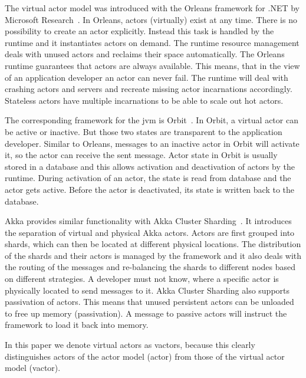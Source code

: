   The virtual actor model was introduced with the Orleans framework for .NET by Microsoft Research~\cite{bernstein:orleans}.
  In Orleans, actors (virtually) exist at any time.
  There is no possibility to create an actor explicitly.
  Instead this task is handled by the runtime and it instantiates actors on demand.
  The runtime resource management deals with unused actors and reclaims their space automatically.
  The Orleans runtime guarantees that actors are always available.
  This means, that in the view of an application developer an actor can never fail.
  The runtime will deal with crashing actors and servers and recreate missing actor incarnations accordingly.
  Stateless actors have multiple incarnations to be able to scale out hot actors.
  
  The corresponding framework for the \gls{jvm} is Orbit~\cite{orbit}.
  In Orbit, a virtual actor can be active or inactive.
  But those two states are transparent to the application developer.
  Similar to Orleans, messages to an inactive actor in Orbit will activate it, so the actor can receive the sent message.
  Actor state in Orbit is usually stored in a database and this allows activation and deactivation of actors by the runtime.
  During activation of an actor, the state is read from database and the actor gets active.
  Before the actor is deactivated, its state is written back to the database.

  Akka provides similar functionality with Akka Cluster Sharding~\cite{akka:clustersharding}.
  It introduces the separation of virtual and physical Akka actors.
  Actors are first grouped into shards, which can then be located at different physical locations.
  The distribution of the shards and their actors is managed by the framework and it also deals with the routing of the messages and re-balancing the shards to different nodes based on different strategies.
  A developer must not know, where a specific actor is physically located to send messages to it.
  Akka Cluster Sharding also supports passivation of actors.
  This means that unused persistent actors can be unloaded to free up memory (passivation).
  A message to passive actors will instruct the framework to load it back into memory.

  In this paper we denote virtual actors as vactors, because this clearly distinguishes actors of the actor model (actor) from those of the virtual actor model (vactor).
  
